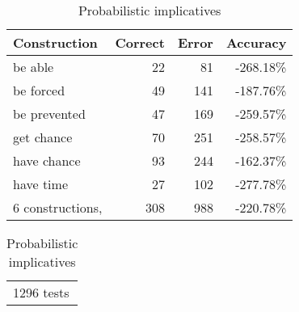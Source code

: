 \begin{table}[ht] \label{probabilistic_constructions}
\begin{small}
\begin{tabular}{lrrr}
Construction  &  Correct & Error & Accuracy\\
\hline
be able & 22 & 81 & -268.18\%\\
be forced & 49 & 141 & -187.76\%\\
be prevented & 47 & 169 & -259.57\%\\
get chance & 70 & 251 & -258.57\%\\
have chance & 93 & 244 & -162.37\%\\
have time & 27 & 102 & -277.78\%\\
\hline\hline
6 constructions, & 308 & 988 & -220.78\%\\
\end{tabular}
\begin{tabular}{l}
1296 tests\\
\end{tabular}
\caption {Probabilistic implicatives}
\end{small}
\end{table}
